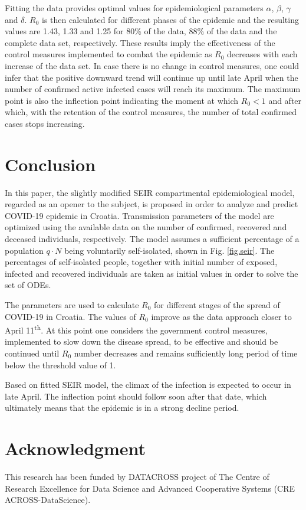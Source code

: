 \documentclass[conference]{IEEEtran}
\begin{document}
Fitting the data provides optimal values for epidemiological parameters $\alpha$, $\beta$, $\gamma$ and $\delta$. $R_0$ is then calculated for different phases of the epidemic and the resulting values are 1.43, 1.33 and 1.25 for 80\% of the data, 88\% of the data and the complete data set, respectively. 
These results imply the effectiveness of the control measures implemented to combat the epidemic as $R_0$ decreases with each increase of the data set. In case there is no change in control measures, one could infer that the positive downward trend will continue up until late April when the number of confirmed active infected cases will reach its maximum. The maximum point is also the inflection point indicating the moment at which $R_0<1$ and after which, with the retention of the control measures, the number of total confirmed cases stops increasing.

\section{Conclusion}
\label{sec.conclusion}
In this paper, the slightly modified SEIR compartmental epidemiological model, regarded as an opener to the subject, is proposed in order to analyze and predict COVID-19 epidemic in Croatia. Transmission parameters of the model are optimized using the available data on the number of confirmed, recovered and deceased individuals, respectively. The model assumes a sufficient percentage of a population $q \cdot N$ being voluntarily self-isolated, shown in Fig. \ref{fig.seir}. The percentages of self-isolated people, together with initial number of exposed, infected and recovered individuals are taken as initial values in order to solve the set of ODEs.

The parameters are used to calculate $R_0$ for different stages of the spread of COVID-19 in Croatia. The values of $R_0$ improve as the data approach closer to April 11\textsuperscript{th}. At this point one considers the government control measures, implemented to slow down the disease spread, to be effective and should be continued until $R_0$ number decreases and remains sufficiently long period of time below the threshold value of 1.

Based on fitted SEIR model, the climax of the infection is expected to occur in late April. The inflection point should follow soon after that date, which ultimately means that the epidemic is in a strong decline period.

\section*{Acknowledgment}
This research has been funded by DATACROSS project of The Centre of Research Excellence for Data Science and Advanced Cooperative Systems (CRE ACROSS-DataScience).
\end{document}
